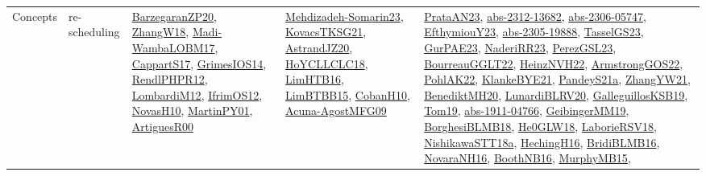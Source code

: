 {\begin{longtable}{lp{3cm}>{\raggedright}p{6cm}>{\raggedright}p{6cm}p{8cm}}
Concepts & re-scheduling & \href{papers/BarzegaranZP20.pdf}{BarzegaranZP20}\cite{BarzegaranZP20}, \href{articles/ZhangW18.pdf}{ZhangW18}\cite{ZhangW18}, \href{papers/Madi-WambaLOBM17.pdf}{Madi-WambaLOBM17}\cite{Madi-WambaLOBM17}, \href{papers/CappartS17.pdf}{CappartS17}\cite{CappartS17}, \href{articles/GrimesIOS14.pdf}{GrimesIOS14}\cite{GrimesIOS14}, \href{papers/RendlPHPR12.pdf}{RendlPHPR12}\cite{RendlPHPR12}, \href{articles/LombardiM12.pdf}{LombardiM12}\cite{LombardiM12}, \href{papers/IfrimOS12.pdf}{IfrimOS12}\cite{IfrimOS12}, \href{articles/NovasH10.pdf}{NovasH10}\cite{NovasH10}, \href{articles/MartinPY01.pdf}{MartinPY01}\cite{MartinPY01}, \href{articles/ArtiguesR00.pdf}{ArtiguesR00}\cite{ArtiguesR00} & \href{papers/Mehdizadeh-Somarin23.pdf}{Mehdizadeh-Somarin23}\cite{Mehdizadeh-Somarin23}, \href{papers/KovacsTKSG21.pdf}{KovacsTKSG21}\cite{KovacsTKSG21}, \href{articles/AstrandJZ20.pdf}{AstrandJZ20}\cite{AstrandJZ20}, \href{papers/HoYCLLCLC18.pdf}{HoYCLLCLC18}\cite{HoYCLLCLC18}, \href{papers/LimHTB16.pdf}{LimHTB16}\cite{LimHTB16}, \href{papers/LimBTBB15.pdf}{LimBTBB15}\cite{LimBTBB15}, \href{papers/CobanH10.pdf}{CobanH10}\cite{CobanH10}, \href{papers/Acuna-AgostMFG09.pdf}{Acuna-AgostMFG09}\cite{Acuna-AgostMFG09} & \href{articles/PrataAN23.pdf}{PrataAN23}\cite{PrataAN23}, \href{articles/abs-2312-13682.pdf}{abs-2312-13682}\cite{abs-2312-13682}, \href{articles/abs-2306-05747.pdf}{abs-2306-05747}\cite{abs-2306-05747}, \href{papers/EfthymiouY23.pdf}{EfthymiouY23}\cite{EfthymiouY23}, \href{articles/abs-2305-19888.pdf}{abs-2305-19888}\cite{abs-2305-19888}, \href{papers/TasselGS23.pdf}{TasselGS23}\cite{TasselGS23}, \href{articles/GurPAE23.pdf}{GurPAE23}\cite{GurPAE23}, \href{articles/NaderiRR23.pdf}{NaderiRR23}\cite{NaderiRR23}, \href{papers/PerezGSL23.pdf}{PerezGSL23}\cite{PerezGSL23}, \href{articles/BourreauGGLT22.pdf}{BourreauGGLT22}\cite{BourreauGGLT22}, \href{articles/HeinzNVH22.pdf}{HeinzNVH22}\cite{HeinzNVH22}, \href{papers/ArmstrongGOS22.pdf}{ArmstrongGOS22}\cite{ArmstrongGOS22}, \href{articles/PohlAK22.pdf}{PohlAK22}\cite{PohlAK22}, \href{papers/KlankeBYE21.pdf}{KlankeBYE21}\cite{KlankeBYE21}, \href{articles/PandeyS21a.pdf}{PandeyS21a}\cite{PandeyS21a}, \href{articles/ZhangYW21.pdf}{ZhangYW21}\cite{ZhangYW21}, \href{articles/BenediktMH20.pdf}{BenediktMH20}\cite{BenediktMH20}, \href{articles/LunardiBLRV20.pdf}{LunardiBLRV20}\cite{LunardiBLRV20}, \href{papers/GalleguillosKSB19.pdf}{GalleguillosKSB19}\cite{GalleguillosKSB19}, \href{papers/Tom19.pdf}{Tom19}\cite{Tom19}, \href{articles/abs-1911-04766.pdf}{abs-1911-04766}\cite{abs-1911-04766}, \href{papers/GeibingerMM19.pdf}{GeibingerMM19}\cite{GeibingerMM19}, \href{articles/BorghesiBLMB18.pdf}{BorghesiBLMB18}\cite{BorghesiBLMB18}, \href{papers/He0GLW18.pdf}{He0GLW18}\cite{He0GLW18}, \href{articles/LaborieRSV18.pdf}{LaborieRSV18}\cite{LaborieRSV18}, \href{papers/NishikawaSTT18a.pdf}{NishikawaSTT18a}\cite{NishikawaSTT18a}, \href{papers/HechingH16.pdf}{HechingH16}\cite{HechingH16}, \href{articles/BridiBLMB16.pdf}{BridiBLMB16}\cite{BridiBLMB16}, \href{articles/NovaraNH16.pdf}{NovaraNH16}\cite{NovaraNH16}, \href{papers/BoothNB16.pdf}{BoothNB16}\cite{BoothNB16}, \href{papers/MurphyMB15.pdf}{MurphyMB15}\cite{MurphyMB15}, 
\end{longtable}}
